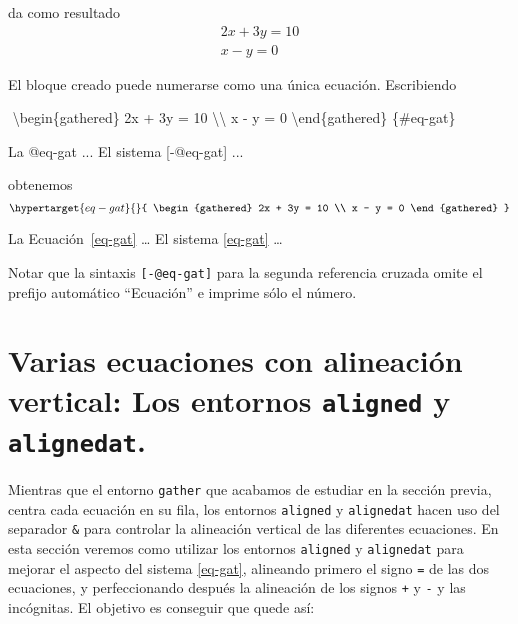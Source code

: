 \documentclass[
  letterpaper,
  DIV=11,
  numbers=noendperiod]{scrartcl}
\newenvironment{Shaded}{\begin{snugshade}}{\end{snugshade}}
\newcommand{\ExtensionTok}[1]{\textcolor[rgb]{0.00,0.23,0.31}{#1}}
\newcommand{\KeywordTok}[1]{\textcolor[rgb]{0.00,0.23,0.31}{#1}}
\newcommand{\NormalTok}[1]{\textcolor[rgb]{0.00,0.23,0.31}{#1}}
\newcommand{\SpecialCharTok}[1]{\textcolor[rgb]{0.37,0.37,0.37}{#1}}
\newcommand{\SpecialStringTok}[1]{\textcolor[rgb]{0.13,0.47,0.30}{#1}}
\begin{document}
da como resultado \[
\begin{gathered} 
2x + 3y =  10 \\ 
x - y =  0
\end{gathered}
\]

El bloque creado puede numerarse como una única ecuación. Escribiendo

\begin{Shaded}
\begin{Highlighting}[]
\SpecialStringTok{$$}
\KeywordTok{\textbackslash{}begin}\NormalTok{\{}\ExtensionTok{gathered}\NormalTok{\}}\SpecialStringTok{ }
\SpecialStringTok{2x + 3y =  10 }\SpecialCharTok{\textbackslash{}\textbackslash{}}\SpecialStringTok{ }
\SpecialStringTok{x {-} y =  0}
\KeywordTok{\textbackslash{}end}\NormalTok{\{}\ExtensionTok{gathered}\NormalTok{\}}
\SpecialStringTok{$$}\NormalTok{\{\#eq{-}gat\}}

\NormalTok{La @eq{-}gat ... El sistema [{-}@eq{-}gat] ...}
\end{Highlighting}
\end{Shaded}

obtenemos \begin{equation}\protect\hypertarget{eq-gat}{}{
\begin{gathered} 
2x + 3y =  10 \\ 
x - y =  0
\end{gathered}
}\label{eq-gat}\end{equation}

La Ecuación~\ref{eq-gat} \ldots{} El sistema \ref{eq-gat} \ldots{}

Notar que la sintaxis \texttt{{[}-@eq-gat{]}} para la segunda referencia
cruzada omite el prefijo automático ``Ecuación'' e imprime sólo el
número.

\hypertarget{varias-ecuaciones-con-alineaciuxf3n-vertical-los-entornos-aligned-y-alignedat.}{%
\section{\texorpdfstring{Varias ecuaciones con alineación vertical: Los
entornos \texttt{aligned} y
\texttt{alignedat}.}{Varias ecuaciones con alineación vertical: Los entornos aligned y alignedat.}}\label{varias-ecuaciones-con-alineaciuxf3n-vertical-los-entornos-aligned-y-alignedat.}}

Mientras que el entorno \texttt{gather} que acabamos de estudiar en la
sección previa, centra cada ecuación en su fila, los entornos
\texttt{aligned} y \texttt{alignedat} hacen uso del separador
\texttt{\&} para controlar la alineación vertical de las diferentes
ecuaciones. En esta sección veremos como utilizar los entornos
\texttt{aligned} y \texttt{alignedat} para mejorar el aspecto del
sistema \ref{eq-gat}, alineando primero el signo \texttt{=} de las dos
ecuaciones, y perfeccionando después la alineación de los signos
\texttt{+} y \texttt{-} y las incógnitas. El objetivo es conseguir que
quede así:
\end{document}
